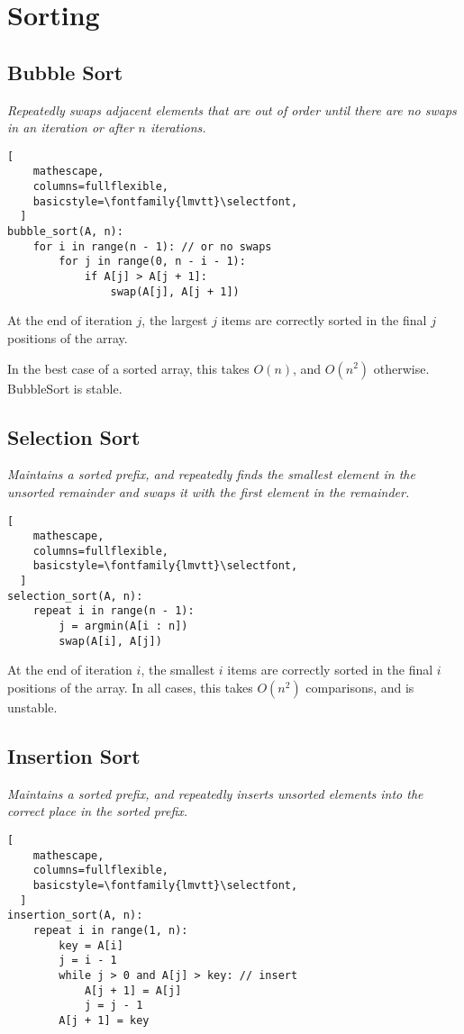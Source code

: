 \section{Sorting}

\subsection{Bubble Sort}
\emph{Repeatedly swaps adjacent elements that are out of order until there are no swaps in an iteration or after $n$ iterations.}

\begin{lstlisting}[
    mathescape,
    columns=fullflexible,
    basicstyle=\fontfamily{lmvtt}\selectfont,
  ]
bubble_sort(A, n):
    for i in range(n - 1): // or no swaps
        for j in range(0, n - i - 1):
            if A[j] > A[j + 1]:
                swap(A[j], A[j + 1])
\end{lstlisting}

At the end of iteration $j$, the largest $j$ items are correctly sorted in the final $j$ positions of the array.

In the best case of a sorted array, this takes $O(n)$, and $O(n^2)$ otherwise. BubbleSort is stable.

\subsection{Selection Sort}
\emph{Maintains a sorted prefix, and repeatedly finds the smallest element in the unsorted remainder and swaps it with the first element in the remainder.}

\begin{lstlisting}[
    mathescape,
    columns=fullflexible,
    basicstyle=\fontfamily{lmvtt}\selectfont,
  ]
selection_sort(A, n):
    repeat i in range(n - 1):
        j = argmin(A[i : n])
        swap(A[i], A[j])
\end{lstlisting}

At the end of iteration $i$, the smallest $i$ items are correctly sorted in the final $i$ positions of the array.
In all cases, this takes $O(n^2)$ comparisons, and is unstable.

\subsection{Insertion Sort}
\emph{Maintains a sorted prefix, and repeatedly inserts unsorted elements into the correct place in the sorted prefix.}

\begin{lstlisting}[
    mathescape,
    columns=fullflexible,
    basicstyle=\fontfamily{lmvtt}\selectfont,
  ]
insertion_sort(A, n):
    repeat i in range(1, n):
        key = A[i]
        j = i - 1
        while j > 0 and A[j] > key: // insert
            A[j + 1] = A[j]
            j = j - 1
        A[j + 1] = key
\end{lstlisting}

